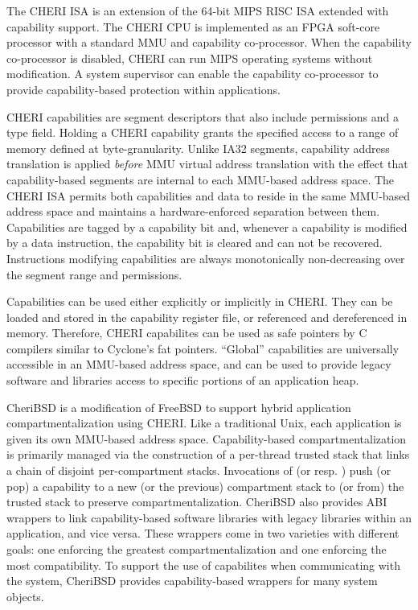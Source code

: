 The CHERI ISA is an extension of the 64-bit MIPS RISC ISA extended with capability support.
The CHERI CPU is implemented as an FPGA soft-core processor with a standard MMU and capability co-processor.
When the capability co-processor is disabled, CHERI can run MIPS operating systems without modification.
A system supervisor can enable the capability co-processor to provide capability-based protection within applications.

CHERI capabilities are segment descriptors that also include permissions and a type field.
Holding a CHERI capability grants the specified access to a range of memory defined at byte-granularity.
Unlike IA32 segments, capability address translation is applied \emph{before} MMU virtual address translation with the effect that capability-based segments are internal to each MMU-based address space.
The CHERI ISA permits both capabilities and data to reside in the same MMU-based address space and maintains a hardware-enforced separation between them.
Capabilities are tagged by a capability bit and, whenever a capability is modified by a data instruction, the capability bit is cleared and can not be recovered.
Instructions modifying capabilities are always monotonically non-decreasing over the segment range and permissions.

Capabilities can be used either explicitly or implicitly in CHERI.
They can be loaded and stored in the capability register file, or referenced and dereferenced in memory.
Therefore, CHERI capabilites can be used as safe pointers by C compilers similar to Cyclone's fat pointers. \cite{Jim:2002:CSD}
``Global'' capabilities are universally accessible in an MMU-based address space, and can be used to provide legacy software and libraries access to specific portions of an application heap.

CheriBSD is a modification of FreeBSD to support hybrid application compartmentalization using CHERI.
Like a traditional Unix, each application is given its own MMU-based address space.
Capability-based compartmentalization is primarily managed via the construction of a per-thread trusted stack that links a chain of disjoint per-compartment stacks.
Invocations of  (or resp. ) push (or pop) a capability to a new (or the previous) compartment stack to (or from) the trusted stack to preserve compartmentalization.
CheriBSD also provides ABI wrappers to link capability-based software libraries with legacy libraries within an application, and vice versa.
These wrappers come in two varieties with different goals: one enforcing the greatest compartmentalization and one enforcing the most compatibility.
To support the use of capabilites when communicating with the system, CheriBSD provides capability-based wrappers for many system objects.

